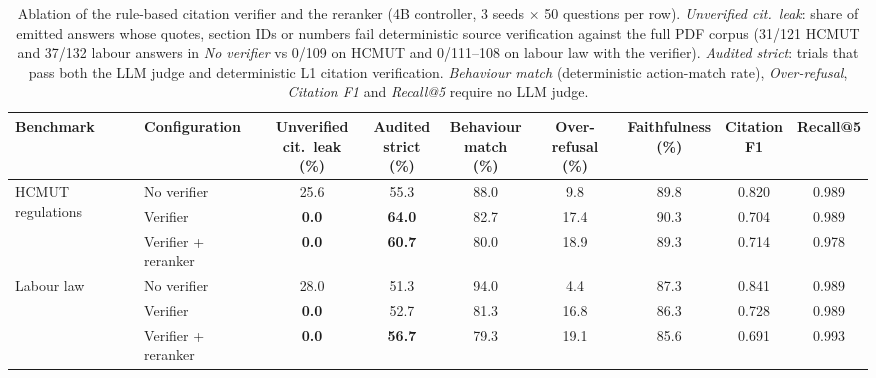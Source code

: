 \begin{table}[!htbp]\tabstyle
\begin{adjustbox}{max width=\textwidth}
\begin{tabular}{@{}llccccccc@{}}
\toprule Benchmark & Configuration & \makecell{Unverified\\cit.\ leak (\%)} & \makecell{Audited\\strict (\%)} & \makecell{Behaviour\\match (\%)} & \makecell{Over-refusal\\(\%)} & \makecell{Faithfulness\\(\%)} & \makecell{Citation\\F1} & Recall@5\\\midrule
\multirow{3}{*}{HCMUT regulations} & No verifier & 25.6 & 55.3 & 88.0 & 9.8 & 89.8 & 0.820 & 0.989\\
 & Verifier & \textbf{0.0} & \textbf{64.0} & 82.7 & 17.4 & 90.3 & 0.704 & 0.989\\
 & Verifier + reranker & \textbf{0.0} & \textbf{60.7} & 80.0 & 18.9 & 89.3 & 0.714 & 0.978\\\midrule
\multirow{3}{*}{Labour law} & No verifier & 28.0 & 51.3 & 94.0 & 4.4 & 87.3 & 0.841 & 0.989\\
 & Verifier & \textbf{0.0} & 52.7 & 81.3 & 16.8 & 86.3 & 0.728 & 0.989\\
 & Verifier + reranker & \textbf{0.0} & \textbf{56.7} & 79.3 & 19.1 & 85.6 & 0.691 & 0.993\\
\bottomrule\end{tabular}
\end{adjustbox}
\caption{Ablation of the rule-based citation verifier and the reranker (4B controller, 3 seeds $\times$ 50 questions per row). \emph{Unverified cit.\ leak}: share of emitted answers whose quotes, section IDs or numbers fail deterministic source verification against the full PDF corpus (31/121 HCMUT and 37/132 labour answers in \emph{No verifier} vs 0/109 on HCMUT and 0/111--108 on labour law with the verifier). \emph{Audited strict}: trials that pass both the LLM judge and deterministic L1 citation verification. \emph{Behaviour match} (deterministic action-match rate), \emph{Over-refusal}, \emph{Citation F1} and \emph{Recall@5} require no LLM judge.}\label{tab:diag}
\end{table}
